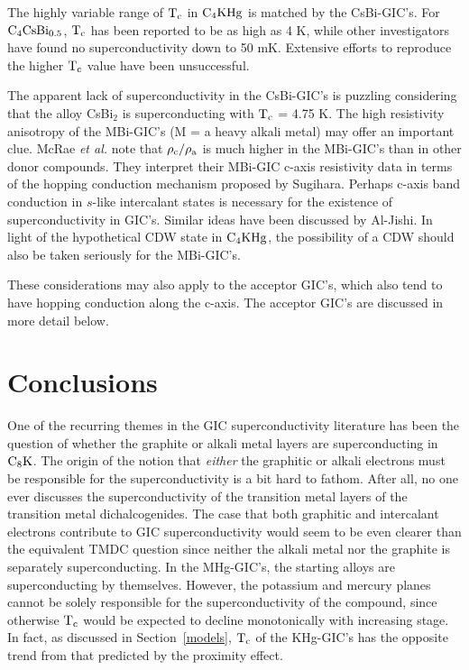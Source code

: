         The highly variable range of  $\rm T_c$ in  $\rm C_4KHg$ is matched
by the CsBi-GIC's.  For $\rm C_4CsBi_{0.5}$, $\rm T_c$ has been reported to
be   as        high    as     4      K,\cite{mcrae85}        while    other
investigators\cite{E291,stang88} have found no superconductivity down to 50
mK.  Extensive efforts to reproduce the higher $\rm T_c$ value have been
unsuccessful.\cite{lagrange85a}  

        The  apparent  lack  of  superconductivity in  the   CsBi-GIC's  is
puzzling considering that  the alloy CsBi$_2$ is  superconducting with $\rm
T_c$   =  4.75  K.\cite{mcrae85}  The high    resistivity anisotropy of the
MBi-GIC's (M = a heavy  alkali metal) may offer an  important  clue.  McRae
{\em et al.\/}\cite{mcrae88} note that $\rm \rho_c / \rho_a$ is much higher
in the   MBi-GIC's  than in other  donor  compounds.  They interpret  their
MBi-GIC   c-axis resistivity   data in  terms   of the  hopping  conduction
mechanism  proposed  by   Sugihara.\cite{E343,M325}    Perhaps  c-axis band
conduction in $s$-like intercalant states is necessary for the existence of
superconductivity in  GIC's.   Similar    ideas  have been     discussed by
Al-Jishi.\cite{M143}  In  light  of   the  hypothetical CDW  state  in $\rm
C_4KHg$, the possibility  of a CDW should  also be taken seriously for  the
MBi-GIC's.

        These  considerations  may also apply to  the acceptor GIC's, which
also tend  to  have hopping conduction  along the c-axis.\cite{mcrae88} The
acceptor GIC's are discussed in more detail below.

\section{Conclusions}
\label{concl}

        One of the recurring themes in the GIC superconductivity literature
has been  the question of whether the  graphite or alkali  metal layers are
superconducting in $\rm  C_8K$.\cite{iye82,takada82}   The  origin  of  the
notion  that {\em  either \/}  the  graphitic or alkali   electrons must be
responsible for the superconductivity is a bit hard to fathom.   After all,
no one ever discusses the superconductivity of the transition  metal layers
of the transition metal dichalcogenides.  The case  that both graphitic and
intercalant electrons contribute to GIC  superconductivity\cite{M143} would
seem to be even clearer than the equivalent TMDC question since neither the
alkali metal   nor  the graphite   is separately superconducting.   In  the
MHg-GIC's, the starting alloys are superconducting by themselves.  However,
the   potassium  and mercury planes   cannot be  solely responsible for the
superconductivity of the  compound,   since  otherwise  $\rm T_c$ would  be
expected  to decline monotonically    with increasing stage.  In  fact,  as
discussed in Section~\ref{models}, $\rm   T_c$ of  the   KHg-GIC's has  the
opposite trend from that predicted by the proximity effect.

